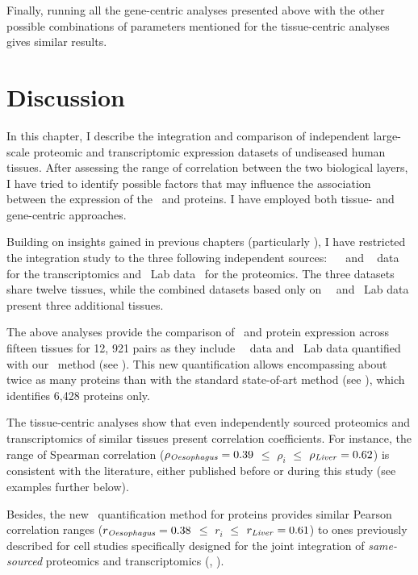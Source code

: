 Finally, running all the gene-centric analyses presented above
with the other possible combinations of parameters
mentioned for the tissue-centric analyses
gives similar results.\mybr\

\vspace{-2mm}
\section{Discussion}
\vspace{-2mm}

In this chapter,
I describe the integration and comparison of independent large-scale
proteomic and transcriptomic expression datasets
of undiseased human tissues.
After assessing the range of correlation between the two biological layers,
I have tried to identify possible factors
that may influence the association
between the expression of the \mRNAs\ and proteins.
I have employed both tissue- and gene-centric approaches.\mybr\

Building on insights gained in previous chapters
(particularly ),
I have restricted the integration study to
the three following independent sources:
\uhlen\ \etal{}~
and \gtex~ data for the transcriptomics
and \pandey\ Lab data~ for the proteomics.
The three datasets share twelve tissues,
while the combined datasets based only on \uhlen\ \etal\ and \pandey\ Lab data
present three additional tissues.\mybr\

The above analyses provide
the comparison of \mRNA\ and protein expression across fifteen tissues
for 12, 921 pairs as they include \uhlen\ \etal\ data and \pandey\ Lab data
quantified with our \PPKM\ method (see ).
This new quantification allows encompassing about twice as many proteins
than with the standard state-of-art method (see ),
which identifies 6,428 proteins only.\mybr\

The tissue-centric analyses show that
even independently sourced proteomics and transcriptomics of similar tissues
present  correlation coefficients.
For instance, the range of Spearman correlation
($\rho_{\text{\emph{Oesophagus}}}=0.39$
$≤$ $\rho_i$ $≤$ $\rho_{\text{\emph{Liver}}}=0.62$)
is consistent with the literature,
either published before or during this study (see examples further below).\mybr\

Besides, the new \PPKM\ quantification method for proteins
provides similar Pearson correlation ranges
($r_{\text{\emph{Oesophagus}}}=0.38$ $≤$ $r_i$  $≤$ $r_{\text{\emph{Liver}}}=0.61$)
to ones previously described for cell studies specifically designed
for the joint integration of \emph{same-sourced} proteomics and transcriptomics
(\eg, \citet{Marguerat2012-sn,schwanhausserglobal:2011,Schwanhausser2013-et,Li2014-ai}).\mybr\

